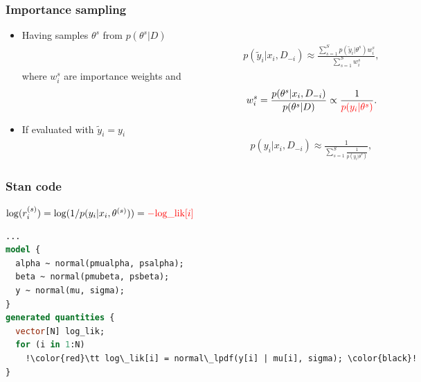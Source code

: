\documentclass[10pt]{beamer}
\begin{document}
\begin{frame}
  \frametitle{Importance sampling}

   \begin{itemize}
   \item Having samples $\theta^s$ from $p(\theta^s|D)$
     \begin{align*}
       p(\tilde{y}_i|x_i,D_{-i})\approx\frac{\sum_{s=1}^Sp(\tilde{y}_i|\theta^s)w_i^s}{\sum_{s=1}^S w_i^s},
     \end{align*}
     where $w_i^s$ are importance weights and
     \begin{align*}
       w_i^s=\frac{p(\theta^s|x_i,D_{-i})}{p(\theta^s|D)}\propto\frac{1}{\color{red} p(y_i|\theta^s)}.
     \end{align*}
 \pause
   \item If evaluated with $\tilde{y}_i=y_i$
     \begin{align*}
       p(y_i|x_i,D_{-i})\approx\frac{1}{\sum_{s=1}^S\frac{1}{p(y_i|\theta^s)}},
     \end{align*}
   \end{itemize}

 \end{frame}

\begin{frame}[fragile]

\frametitle{Stan code }

  \vspace{\baselineskip}
  $ \log(r_i^{(s)}) = \log(1/p(y_i|x_i,\theta^{(s)})) = {\color{red}-\mbox{log\_lik}[i]}$
  \vspace{\baselineskip}

  \pause
  {\small
\begin{lstlisting}[language=Stan,escapechar=!]
...
model {
  alpha ~ normal(pmualpha, psalpha);
  beta ~ normal(pmubeta, psbeta);
  y ~ normal(mu, sigma);
}
generated quantities {
  vector[N] log_lik;
  for (i in 1:N)
    !\color{red}\tt log\_lik[i] = normal\_lpdf(y[i] | mu[i], sigma); \color{black}!
}
\end{lstlisting}
  }

\end{frame}
\end{document}
